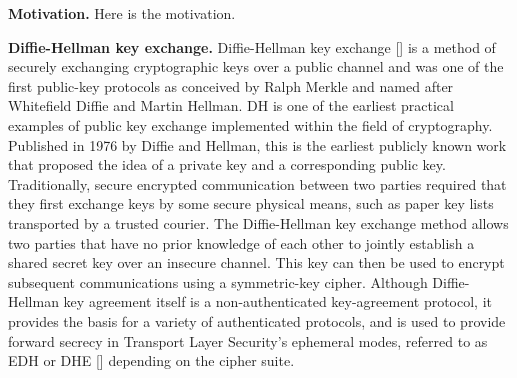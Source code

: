 \textbf{Motivation.} Here is the motivation.

\textbf{Diffie-Hellman key exchange.} Diffie-Hellman key exchange [\cite{li2010research}] is a method of securely exchanging cryptographic keys over a public channel
and was one of the first public-key protocols
as conceived by Ralph Merkle and named after Whitefield Diffie and Martin Hellman.
DH is one of the earliest practical examples of public key exchange implemented within the field of cryptography.
Published in 1976 by Diffie and Hellman, this is the earliest publicly known work that proposed the idea of a private
key and a corresponding public key.
Traditionally, secure encrypted communication between two parties required that they first exchange keys by some secure physical means,
such as paper key lists transported by a trusted courier.
The Diffie-Hellman key exchange method allows two parties that have no prior knowledge of
each other to jointly establish a shared secret key over an insecure channel.
This key can then be used to encrypt subsequent communications using a symmetric-key cipher.
Although Diffie-Hellman key agreement itself is a non-authenticated key-agreement protocol, it provides the basis for a
variety of authenticated protocols, and is used to provide forward secrecy in Transport Layer Security's ephemeral modes,
referred to as EDH or DHE [\cite{ahirwal2013elliptic}] depending on the cipher suite.


